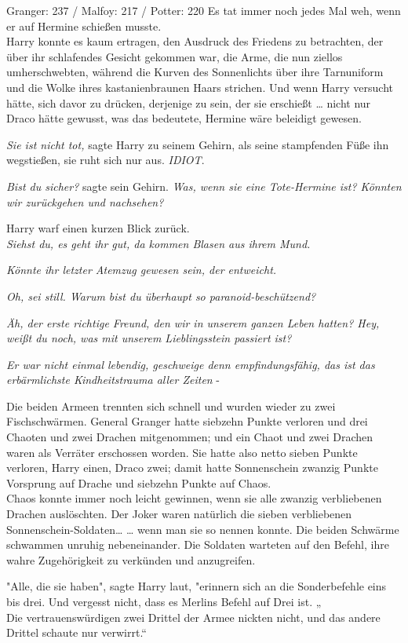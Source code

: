 {Granger: 237 / Malfoy: 217 / Potter: 220 Es tat immer noch jedes Mal weh, wenn er auf Hermine schießen musste.\\ Harry konnte es kaum ertragen, den Ausdruck des Friedens zu betrachten, der über ihr schlafendes Gesicht gekommen war, die Arme, die nun ziellos umherschwebten, während die Kurven des Sonnenlichts über ihre Tarnuniform und die Wolke ihres kastanienbraunen Haars strichen. Und wenn Harry versucht hätte, sich davor zu drücken, derjenige zu sein, der sie erschießt … nicht nur Draco hätte gewusst, was das bedeutete, Hermine wäre beleidigt gewesen.

\emph{Sie ist nicht tot,} sagte Harry zu seinem Gehirn, als seine stampfenden Füße ihn wegstießen, sie ruht sich nur aus. \emph{IDIOT}.

\emph{Bist du sicher?} sagte sein Gehirn. \emph{Was, wenn sie eine Tote-Hermine ist? Könnten wir zurückgehen und nachsehen?}

Harry warf einen kurzen Blick zurück.\\ \emph{Siehst du, es geht ihr gut, da kommen Blasen aus ihrem Mund.}

\emph{Könnte ihr letzter Atemzug gewesen sein, der entweicht.}

\emph{Oh, sei still. Warum bist du überhaupt so paranoid-beschützend?}

\emph{Äh, der erste richtige Freund, den wir in unserem ganzen Leben hatten? Hey, weißt du noch, was mit unserem Lieblingsstein passiert ist?}

\emph{Er war nicht einmal lebendig, geschweige denn empfindungsfähig, das ist das erbärmlichste Kindheitstrauma aller Zeiten} -

Die beiden Armeen trennten sich schnell und wurden wieder zu zwei Fischschwärmen. General Granger hatte siebzehn Punkte verloren und drei Chaoten und zwei Drachen mitgenommen; und ein Chaot und zwei Drachen waren als Verräter erschossen worden. Sie hatte also netto sieben Punkte verloren, Harry einen, Draco zwei; damit hatte Sonnenschein zwanzig Punkte Vorsprung auf Drache und siebzehn Punkte auf Chaos.\\ Chaos konnte immer noch leicht gewinnen, wenn sie alle zwanzig verbliebenen Drachen auslöschten. Der Joker waren natürlich die sieben verbliebenen Sonnenschein-Soldaten… … wenn man sie so nennen konnte. Die beiden Schwärme schwammen unruhig nebeneinander. Die Soldaten warteten auf den Befehl, ihre wahre Zugehörigkeit zu verkünden und anzugreifen.

"Alle, die sie haben", sagte Harry laut, "erinnern sich an die Sonderbefehle eins bis drei. Und vergesst nicht, dass es Merlins Befehl auf Drei ist. „\\ Die vertrauenswürdigen zwei Drittel der Armee nickten nicht, und das andere Drittel schaute nur verwirrt.“

}
